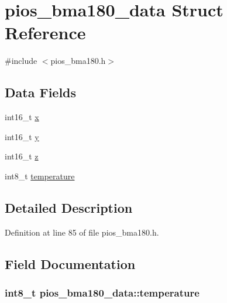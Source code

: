 \hypertarget{structpios__bma180__data}{\section{pios\-\_\-bma180\-\_\-data \-Struct \-Reference}
\label{structpios__bma180__data}
}


{\ttfamily \#include $<$pios\-\_\-bma180.\-h$>$}

\subsection*{\-Data \-Fields}
\begin{DoxyCompactItemize}
\item 
int16\-\_\-t \hyperlink{structpios__bma180__data_ab20204f27147fd128d19681833d58a46}{x}
\item 
int16\-\_\-t \hyperlink{structpios__bma180__data_ac27d83e52f78250976c48fd43d6c7512}{y}
\item 
int16\-\_\-t \hyperlink{structpios__bma180__data_ac424fcb7679ca4c9956a8c80ad486cc6}{z}
\item 
int8\-\_\-t \hyperlink{structpios__bma180__data_ae7f00e32e40c79bbc387130336cd0e64}{temperature}
\end{DoxyCompactItemize}


\subsection{\-Detailed \-Description}


\-Definition at line 85 of file pios\-\_\-bma180.\-h.



\subsection{\-Field \-Documentation}
\hypertarget{structpios__bma180__data_ae7f00e32e40c79bbc387130336cd0e64}{
\subsubsection[{temperature}]{\setlength{\rightskip}{0pt plus 5cm}int8\-\_\-t {\bf pios\-\_\-bma180\-\_\-data\-::temperature}}}\label{structpios__bma180__data_ae7f00e32e40c79bbc387130336cd0e64}



